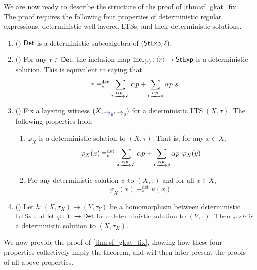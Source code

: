 \documentclass[orivec,envcountsect,envcountsame]{llncs}
\begin{document}
We are now ready to describe the structure of the proof of \cref{thm:sf_gkat_fix}.
The proof requires the following four properties of deterministic regular expressions, deterministic well-layered LTSs, and their deterministic solutions.
\begin{enumerate}
	\item () \(\mathsf{Det}\) is a deterministic subcoalgebra of \((\mathsf{StExp},\ell)\).
	\item () For any \(r \in \mathsf{Det}\), the inclusion map \(\operatorname{incl}_{\langle r\rangle} \colon \langle r \rangle \to \mathsf{StExp}\) is a deterministic solution.
	This is equivalent to saying that
	\[
	r \equiv_*^{\det} \sum_{r\tr{\alpha p} \checkmark} \alpha p + \sum_{r\tr{\alpha p} s} \alpha p~s
	\]
	\item () Fix a layering witness \((X,\eo,\bo)\) for a deterministic LTS \((X,\tau)\).
    The following properties hold:
	\begin{enumerate}
		\item[(a)]\(\varphi_X\) is a deterministic solution to \((X,\tau)\). That is, for any \(x \in X\),\[
		\varphi_X(x) \equiv_*^{\det} \sum_{x\tr{\alpha p}\checkmark}  \alpha p + \sum_{x\tr{\alpha p} y} \alpha p~\varphi_X(y)
		\]
		\item[(b)] For any deterministic solution \(\psi\) to \((X,\tau)\) and for all \(x \in X\), \[
		\varphi_X(x) \equiv_*^{\det} \psi(x)
		\]
	\end{enumerate}
	\item () Let \(h\colon (X,\tau_X) \to (Y,\tau_Y)\) be a homomorphism between deterministic LTSs and let \(\varphi\colon Y \to \mathsf{Det}\) be a deterministic solution to \((Y,\tau)\).
	Then \(\varphi\circ h\) is a deterministic solution to \((X,\tau_X)\).
\end{enumerate}
We now provide the proof of \cref{thm:sf_gkat_fix}, showing how these four properties collectively imply the theorem, and will then later present the proofs of all above properties.
\end{document}
